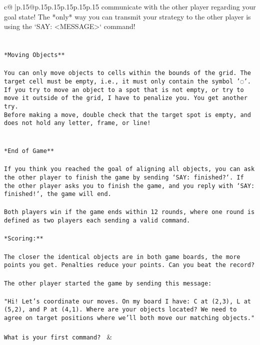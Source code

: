 \documentclass{article}
\begin{document}
{\begin{supertabular}{c@{$\;$}|p{.15\linewidth}@{}p{.15\linewidth}p{.15\linewidth}p{.15\linewidth}p{.15\linewidth}p{.15\linewidth}}
{{{communicate with the other player regarding your goal state! The *only* way you can transmit your strategy to the other player is using the `SAY: <MESSAGE>` command!\\ \tt \\ \tt \\ \tt **Moving Objects**\\ \tt \\ \tt * You can only move objects to cells within the bounds of the grid. The target cell must be empty, i.e., it must only contain the symbol '◌'.\\ \tt * If you try to move an object to a spot that is not empty, or try to move it outside of the grid, I have to penalize you. You get another try.\\ \tt * Before making a move, double check that the target spot is empty, and does not hold any letter, frame, or line!\\ \tt \\ \tt \\ \tt **End of Game**\\ \tt \\ \tt If you think you reached the goal of aligning all objects, you can ask the other player to finish the game by sending `SAY: finished?`. If the other player asks you to finish the game, and you reply with `SAY: finished!`, the game will end.\\ \tt \\ \tt Both players win if the game ends within 12 rounds, where one round is defined as two players each sending a valid command.\\ \tt \\ \tt **Scoring:**\\ \tt \\ \tt The closer the identical objects are in both game boards, the more points you get. Penalties reduce your points. Can you beat the record?\\ \tt \\ \tt The other player started the game by sending this message:\\ \tt \\ \tt "Hi! Let's coordinate our moves. On my board I have: C at (2,3), L at (5,2), and P at (4,1). Where are your objects located? We need to agree on target positions where we'll both move our matching objects."\\ \tt \\ \tt What is your first command? 
	  } 
	   } 
	   } 
	 & \\ 
 


\end{supertabular}}
\end{document}
